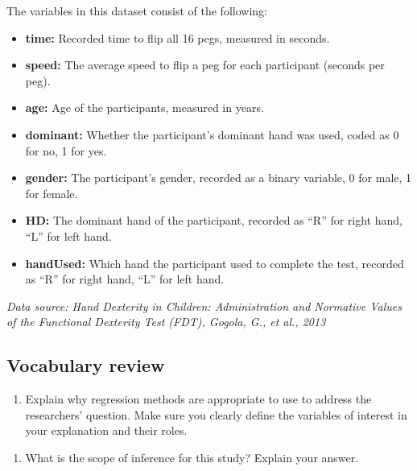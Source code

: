 \documentclass[
]{report}
\providecommand{\tightlist}{%
  \setlength{\itemsep}{0pt}\setlength{\parskip}{0pt}}
\begin{document}
The variables in this dataset consist of the following:

\begin{itemize}
\item
  \textbf{time:} Recorded time to flip all 16 pegs, measured in seconds.
\item
  \textbf{speed:} The average speed to flip a peg for each participant (seconds per peg).
\item
  \textbf{age:} Age of the participants, measured in years.
\item
  \textbf{dominant:} Whether the participant's dominant hand was used, coded as 0 for no, 1 for yes.
\item
  \textbf{gender:} The participant's gender, recorded as a binary variable, 0 for male, 1 for female.
\item
  \textbf{HD:} The dominant hand of the participant, recorded as ``R'' for right hand, ``L'' for left hand.
\item
  \textbf{handUsed:} Which hand the participant used to complete the test, recorded as ``R'' for right hand, ``L'' for left hand.
\end{itemize}

\emph{Data source: Hand Dexterity in Children: Administration and Normative Values of the Functional Dexterity Test (FDT), Gogola, G., et al., 2013}

\hypertarget{vocabulary-review}{%
\subsection{Vocabulary review}\label{vocabulary-review}}

\begin{enumerate}
\def\labelenumi{\arabic{enumi}.}
\tightlist
\item
  Explain why regression methods are appropriate to use to address the researchers' question. Make sure you clearly define the variables of interest in your explanation and their roles.
\end{enumerate}

\vspace{1in}

\begin{enumerate}
\def\labelenumi{\arabic{enumi}.}
\setcounter{enumi}{1}
\tightlist
\item
  What is the scope of inference for this study? Explain your answer.
\end{enumerate}

\vspace{1in}
\end{document}
